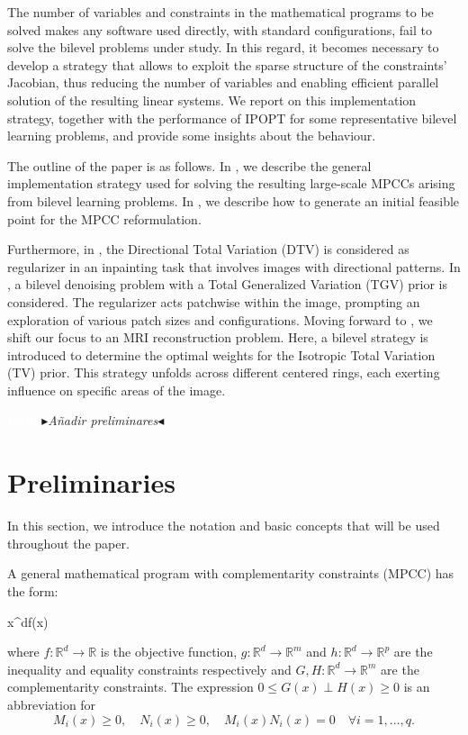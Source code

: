 \documentclass[review,onefignum,onetabnum]{siamonline190516}
\newcommand{\R}{\mathbb{R}}
\newcommand{\nb}[3]{
		{\colorbox{#2}{\bfseries\sffamily\scriptsize\textcolor{white}{#1}}}
		{\textcolor{#2}{\sf\small$\blacktriangleright$\textit{#3}$\blacktriangleleft$}}}
\newcommand{\dr}[1]{\nb{Dani}{white!30!blue}{#1}}
\begin{document}
The number of variables and constraints in the mathematical programs to be solved makes any software used directly, with standard configurations, fail to solve the bilevel problems under study. In this regard, it becomes necessary to develop a strategy that allows to exploit the sparse structure of the constraints' Jacobian, thus reducing the number of variables and enabling efficient parallel solution of the resulting linear systems. We report on this implementation strategy, together with the performance of IPOPT for some representative bilevel learning problems, and provide some insights about the behaviour.

The outline of the paper is as follows. In , we describe the general implementation strategy used for solving the resulting large-scale MPCCs arising from bilevel learning problems. In , we describe how to generate an initial feasible point for the MPCC reformulation.

Furthermore, in , the Directional Total Variation (DTV) is considered as regularizer in an inpainting task that involves images with directional patterns. In , a bilevel denoising problem  with a Total Generalized Variation (TGV) prior is considered. The regularizer acts patchwise within the image, prompting an exploration of various patch sizes and configurations. Moving forward to , we shift our focus to an MRI reconstruction problem. Here, a bilevel strategy is introduced to determine the optimal weights for the Isotropic Total Variation (TV) prior. This strategy unfolds across different centered rings, each exerting influence on specific areas of the image.


\dr{Añadir preliminares}
\section{Preliminaries}

In this section, we introduce the notation and basic concepts that will be used throughout the paper.

A general mathematical program with complementarity constraints (MPCC) has the form:
\begin{mini!}
  {x\in\R^{d}}{f(x)}{\label{eq:mpcc}}{} 
\end{mini!}
where $f:\mathbb{R}^d\to \mathbb{R}$ is the objective function, $g:\mathbb{R}^d\to\mathbb{R}^m$ and $h:\mathbb{R}^d\to\mathbb{R}^p$ are the inequality and equality constraints respectively and $G,H:\mathbb{R}^d\to\mathbb{R}^m$ are the complementarity constraints. The expression $0\leq G(x)\perp H(x)\geq 0$ is an abbreviation for 
$$
M_i(x)\geq 0,\quad N_i(x)\geq 0,\quad M_i(x)N_i(x)=0\quad \forall i=1,\ldots,q. 
$$
\end{document}
